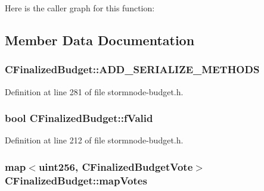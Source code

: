 Here is the caller graph for this function\+:




\subsection{Member Data Documentation}
\hypertarget{class_c_finalized_budget_ad426a5e67867bcb8f73df4aef50ac588}{}
\subsubsection[{A\+D\+D\+\_\+\+S\+E\+R\+I\+A\+L\+I\+Z\+E\+\_\+\+M\+E\+T\+H\+O\+D\+S}]{\setlength{\rightskip}{0pt plus 5cm}C\+Finalized\+Budget\+::\+A\+D\+D\+\_\+\+S\+E\+R\+I\+A\+L\+I\+Z\+E\+\_\+\+M\+E\+T\+H\+O\+D\+S}\label{class_c_finalized_budget_ad426a5e67867bcb8f73df4aef50ac588}


Definition at line 281 of file stormnode-\/budget.\+h.

\hypertarget{class_c_finalized_budget_a00d9e3055bebaaef28543bd67e4ca162}{}
\subsubsection[{f\+Valid}]{\setlength{\rightskip}{0pt plus 5cm}bool C\+Finalized\+Budget\+::f\+Valid}\label{class_c_finalized_budget_a00d9e3055bebaaef28543bd67e4ca162}


Definition at line 212 of file stormnode-\/budget.\+h.

\hypertarget{class_c_finalized_budget_a756460095ed59fd39e7f3018b4b208dd}{}
\subsubsection[{map\+Votes}]{\setlength{\rightskip}{0pt plus 5cm}map$<${\bf uint256}, {\bf C\+Finalized\+Budget\+Vote}$>$ C\+Finalized\+Budget\+::map\+Votes}\label{class_c_finalized_budget_a756460095ed59fd39e7f3018b4b208dd}


